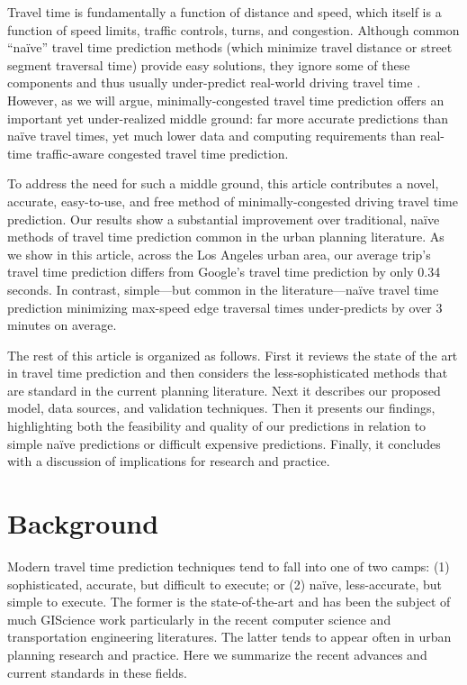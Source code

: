 \documentclass[12pt,letterpaper]{article} %
\begin{document}
Travel time is fundamentally a function of distance and speed, which itself is a function of speed limits, traffic controls, turns, and congestion. Although common \enquote{naïve} travel time prediction methods (which minimize travel distance or street segment traversal time) provide easy solutions, they ignore some of these components and thus usually under-predict real-world driving travel time \citep{ludwig2023traffic,salonen2013modelling,yiannakoulias2013estimating}. However, as we will argue, minimally-congested travel time prediction offers an important yet under-realized middle ground: far more accurate predictions than naïve travel times, yet much lower data and computing requirements than real-time traffic-aware congested travel time prediction.

To address the need for such a middle ground, this article contributes a novel, accurate, easy-to-use, and free method of minimally-congested driving travel time prediction. Our results show a substantial improvement over traditional, naïve methods of travel time prediction common in the urban planning literature. As we show in this article, across the Los Angeles urban area, our average trip's travel time prediction differs from Google's travel time prediction by only 0.34 seconds. In contrast, simple---but common in the literature---naïve travel time prediction minimizing max-speed edge traversal times under-predicts by over 3 minutes on average.

The rest of this article is organized as follows. First it reviews the state of the art in travel time prediction and then considers the less-sophisticated methods that are standard in the current planning literature. Next it describes our proposed model, data sources, and validation techniques. Then it presents our findings, highlighting both the feasibility and quality of our predictions in relation to simple naïve predictions or difficult expensive predictions. Finally, it concludes with a discussion of implications for research and practice.

\section{Background}\label{sec:background}

Modern travel time prediction techniques tend to fall into one of two camps: (1) sophisticated, accurate, but difficult to execute; or (2) naïve, less-accurate, but simple to execute. The former is the state-of-the-art and has been the subject of much GIScience work particularly in the recent computer science and transportation engineering literatures. The latter tends to appear often in urban planning research and practice. Here we summarize the recent advances and current standards in these fields.
\end{document}
